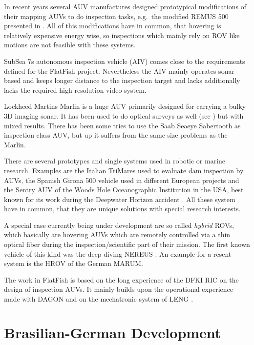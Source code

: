 \documentclass[conference]{IEEEtran}
\begin{document}
In recent years several AUV manufactures designed prototypical modifications of their mapping AUVs to do inspection tasks, e.g.~the modified REMUS 500 presented in \cite{packard2010}. All of this modifications have in common, that hovering is relatively expensive energy wise, so inspections which mainly rely on ROV like motions are not feasible with these systems.

SubSea 7s autonomous inspection vehicle (AIV) \cite{AIV} comes close to the requirements defined for the FlatFish project. Nevertheless the AIV mainly operates sonar based and keeps longer distance to the inspection target and lacks additionally lacks the required high resolution video system.

Lockheed Martins Marlin \cite{Marlinmk1} is a huge AUV primarily designed for carrying a bulky 3D imaging sonar. It has been used to do optical surveys as well (see \cite{mcleod2013}) but with mixed results. There has been some tries to use the Saab Seaeye Sabertooth \cite{johansson2010} as inspection class AUV, but up it suffers from the same size problems as the Marlin. 

There are several prototypes and single systems used in robotic or marine research. Examples are the Italian TriMares \cite{cruz2011} used to evaluate dam inspection by AUVs, the Spanish Girona 500 vehicle \cite{ribas2012} used in different European projects and the Sentry AUV of the Woods Hole Oceanographic Institution in the USA, best known for its work during the Deepwater Horizon accident \cite{Kinsey2011}. All these system have in common, that they are unique solutions with special research interests.

A special case currently being under development are so called \textit{hybrid} ROVs, which basically are hovering AUVs which are remotely controlled via a thin optical fiber during the inspection/scientific part of their mission. The first known vehicle of this kind was the deep diving NEREUS \cite{bowen2009}. An example for a resent system is the HROV \cite{meinecke2011} of the German MARUM.

The work in FlatFish is based on the long experience of the DFKI RIC on the design of inspection AUVs. It mainly builds upon the operational experience made with DAGON \cite{hildebrandt2012} and on the mechatronic system of LENG \cite{hildebrandt2013}.

\section{Brasilian-German Development}
\end{document}
